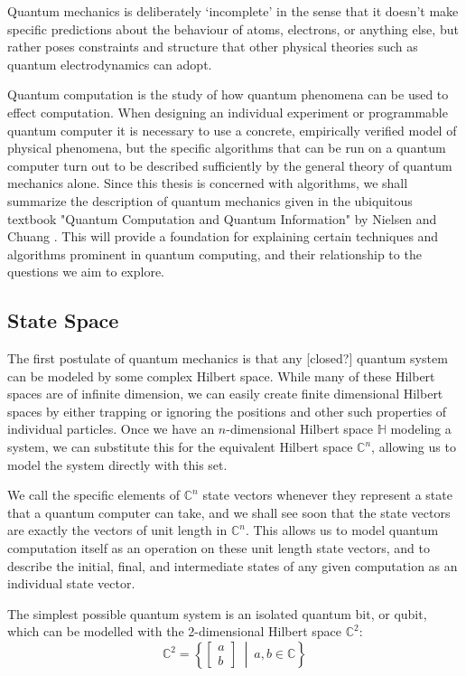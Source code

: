 Quantum mechanics is deliberately `incomplete' in the sense that it doesn't make specific predictions about the behaviour of atoms, electrons, or anything else, but rather poses constraints and structure that other physical theories such as quantum electrodynamics can adopt.

Quantum computation is the study of how quantum phenomena can be used to effect computation. When designing an individual experiment or programmable quantum computer it is necessary to use a concrete, empirically verified model of physical phenomena, but the specific algorithms that can be run on a quantum computer turn out to be described sufficiently by the general theory of quantum mechanics alone. Since this thesis is concerned with algorithms, we shall summarize the description of quantum mechanics given in the ubiquitous textbook "Quantum Computation and Quantum Information" by Nielsen and Chuang \cite{textbook}. This will provide a foundation for explaining certain techniques and algorithms prominent in quantum computing, and their relationship to the questions we aim to explore.
\subsection{State Space}
The first postulate of quantum mechanics is that any [closed?] quantum system can be modeled by some complex Hilbert space. While many of these Hilbert spaces are of infinite dimension, we can easily create finite dimensional Hilbert spaces by either trapping or ignoring the positions and other such properties of individual particles. Once we have an $n$-dimensional Hilbert space $\mathbb{H}$ modeling a system, we can substitute this for the equivalent Hilbert space $\mathbb{C}^n$, allowing us to model the system directly with this set.

We call the specific elements of $\mathbb{C}^n$ state vectors whenever they represent a state that a quantum computer can take, and we shall see soon that the state vectors are exactly the vectors of unit length in $\mathbb{C}^n$. This allows us to model quantum computation itself as an operation on these unit length state vectors, and to describe the initial, final, and intermediate states of any given computation as an individual state vector.

The simplest possible quantum system is an isolated quantum bit, or qubit, which can be modelled with the 2-dimensional Hilbert space $\mathbb{C}^2$:
\[
\mathbb{C}^2 = \left\{\left[\begin{matrix}
a\\
b
\end{matrix}\right]\ \middle|\ a, b \in \mathbb{C}\right\}
\]
